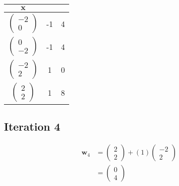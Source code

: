 \documentclass[11pt, a4paper]{article}
\begin{document}
\begin{table}[htbp]
	\centering
	\begin{tabular}{|c|c|c|}
		\toprule
		$\boldsymbol{x}$    \\
		\midrule
		$\begin{pmatrix} -2 \\ 0 \end{pmatrix}$ & -1 & 4 \\
		$\begin{pmatrix} 0  \\ -2 \end{pmatrix}$ & -1 & 4 \\
		$\begin{pmatrix} -2 \\ 2 \end{pmatrix}$ & 1 & 0 \\
		$\begin{pmatrix} 2  \\ 2 \end{pmatrix}$ & 1 & 8 \\
		\hline
	\end{tabular}
\end{table}

\FloatBarrier

\subsection{Iteration 4}

\begin{align*}
	\boldsymbol{w}_4 & = \begin{pmatrix} 2 \\ 2 \end{pmatrix} + (1)  \begin{pmatrix} -2 \\ 2 \end{pmatrix}  \\
	                 & = \begin{pmatrix} 0 \\ 4 \end{pmatrix}
\end{align*}
\end{document}
